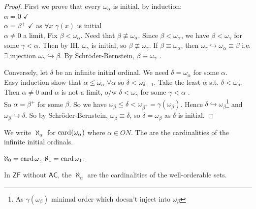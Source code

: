 \begin{proof}
    First we prove that every $\omega_\alpha$ is initial, by induction: \\
    $\alpha = 0$ $\checkmark$ \\
    $\alpha = \beta^+$ $\checkmark$ as $\forall x$ $\gamma(x)$ is initial \\
    $\alpha \neq 0$ a limit, Fix $\beta < \omega_\alpha$.
    Need that $\beta \not\equiv \omega_\alpha$.
    Since $\beta < \omega_\alpha$, we  have $\beta < \omega_\gamma$ for some $\gamma < \alpha$.
    Then by IH, $\omega_\gamma$ is initial, so $\beta \not\equiv \omega_\gamma$.
    If $\beta \equiv \omega_\alpha$, then $\omega_\gamma \hookrightarrow \omega_\alpha \equiv \beta$ i.e. $\exists$ injection $\omega_\gamma \hookrightarrow \beta$.
    By Schr\"oder-Bernstein, $\beta \equiv \omega_\gamma$ \Lightning.

    Conversely, let $\delta$ be an infinite initial ordinal.
    We need $\delta = \omega_\alpha$ for some $\alpha$. \\
    Easy induction show that $\alpha \leq \omega_\alpha \; \forall \alpha$ so $\delta < \omega_{\delta + 1}$.
    Take the least $\alpha$ s.t. $\delta < \omega_\alpha$.
    Then $\alpha \neq 0$ and $\alpha$ is not a limit, o/w $\delta < \omega_\gamma$ for some $\gamma < \alpha$ \Lightning. \\
    So $\alpha = \beta^+$ for some $\beta$.
    So we have $\omega_\beta \leq \delta < \omega_{\beta^+} = \gamma(\omega_\beta)$.
    Hence $\delta \hookrightarrow \omega_\beta$\footnote{As $\gamma(\omega_\beta)$ minimal order which doesn't inject into $\omega_\beta$} and $\omega_\beta \hookrightarrow \delta$.
    So by Schr\"oder-Bernstein, $\omega_\beta \equiv \delta$, so $\delta = \omega_\beta$ as $\delta$ is initial.
\end{proof}

\begin{definition}
    We write $\aleph_\alpha$ for $\operatorname{card}(\omega_\alpha)$ where $\alpha \in ON$.
    The  are the cardinalities of the infinite initial ordinals.
\end{definition}

\begin{example}
    $\aleph_0 = \operatorname{card} \omega$, $\aleph_1 = \operatorname{card} \omega_1$.
\end{example}

In $\mathsf{ZF}$ without $\mathsf{AC}$, the $\aleph_\alpha$ are the cardinalities of the well-orderable sets.

